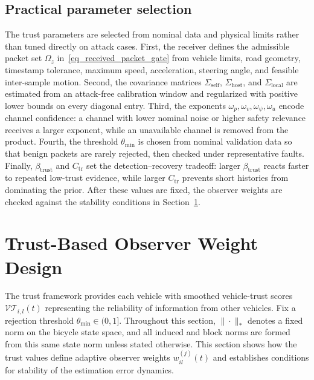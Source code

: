 \documentclass[letterpaper,journal]{IEEEtran}
\def\VT{\mathcal{VT}} %
\def\O{\mathcal{O}} %
\begin{document}
\subsection{Practical parameter selection}\label{subsec_trust_tuning}
The trust parameters are selected from nominal data and physical limits rather than tuned directly on attack cases. First, the receiver defines the admissible packet set $\Omega_z$ in~\eqref{eq_received_packet_gate} from vehicle limits, road geometry, timestamp tolerance, maximum speed, acceleration, steering angle, and feasible inter-sample motion. Second, the covariance matrices $\Sigma_{\text{self}}$, $\Sigma_{\text{host}}$, and $\Sigma_{\text{local}}$ are estimated from an attack-free calibration window and regularized with positive lower bounds on every diagonal entry. Third, the exponents $\omega_p,\omega_v,\omega_\psi,\omega_u$ encode channel confidence: a channel with lower nominal noise or higher safety relevance receives a larger exponent, while an unavailable channel is removed from the product. Fourth, the threshold $\theta_{\min}$ is chosen from nominal validation data so that benign packets are rarely rejected, then checked under representative faults. Finally, $\beta_{\text{trust}}$ and $C_{\mathrm{tr}}$ set the detection--recovery tradeoff: larger $\beta_{\text{trust}}$ reacts faster to repeated low-trust evidence, while larger $C_{\mathrm{tr}}$ prevents short histories from dominating the prior. After these values are fixed, the observer weights are checked against the stability conditions in Section~\ref{sec_weight_design}.



\section{Trust-Based Observer Weight Design}\label{sec_weight_design}
The trust framework provides each vehicle with smoothed vehicle-trust scores $\VT_{i,l}(t)$ representing the reliability of information from other vehicles.
Fix a rejection threshold $\theta_{\min}\in(0,1]$. Throughout this section, $\|\cdot\|_*$ denotes a fixed norm on the bicycle state space, and all induced and block norms are formed from this same state norm unless stated otherwise.
This section shows how the trust values define adaptive observer weights $w_{il}^{(j)}(t)$ and establishes conditions for stability of the estimation error dynamics.
\end{document}
